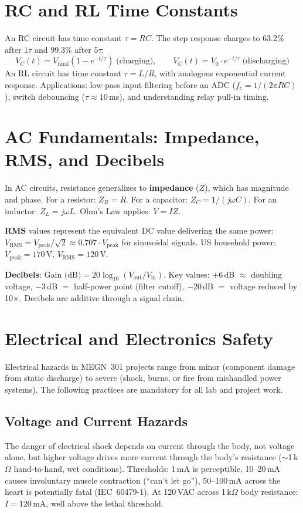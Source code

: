 \section{RC and RL Time Constants}

An RC circuit has time constant $\tau = RC$. The step response charges to 63.2\% after $1\tau$ and 99.3\% after $5\tau$:
\begin{equation}
V_C(t) = V_{\text{final}}\left(1 - e^{-t/\tau}\right) \;\text{(charging)}, \qquad V_C(t) = V_0 \cdot e^{-t/\tau} \;\text{(discharging)}
\end{equation}
An RL circuit has time constant $\tau = L/R$, with analogous exponential current response. Applications: low-pass input filtering before an ADC ($f_c = 1/(2\pi RC)$), switch debouncing ($\tau \approx 10$\,ms), and understanding relay pull-in timing.


\section{AC Fundamentals: Impedance, RMS, and Decibels}

In AC circuits, resistance generalizes to \textbf{impedance} ($Z$), which has magnitude and phase. For a resistor: $Z_R = R$. For a capacitor: $Z_C = 1/(j\omega C)$. For an inductor: $Z_L = j\omega L$. Ohm's Law applies: $V = IZ$.

\textbf{RMS} values represent the equivalent DC value delivering the same power: $V_{\text{RMS}} = V_{\text{peak}}/\sqrt{2} \approx 0.707 \cdot V_{\text{peak}}$ for sinusoidal signals. US household power: $V_{\text{peak}} = 170$\,V, $V_{\text{RMS}} = 120$\,V.

\textbf{Decibels}: $\text{Gain (dB)} = 20\log_{10}(V_{\text{out}}/V_{\text{in}})$. Key values: $+6$\,dB $\approx$ doubling voltage, $-3$\,dB $=$ half-power point (filter cutoff), $-20$\,dB $=$ voltage reduced by 10$\times$. Decibels are additive through a signal chain.


\section{Electrical and Electronics Safety}

Electrical hazards in MEGN~301 projects range from minor (component damage from static discharge) to severe (shock, burns, or fire from mishandled power systems). The following practices are mandatory for all lab and project work.

\subsection{Voltage and Current Hazards}
The danger of electrical shock depends on current through the body, not voltage alone, but higher voltage drives more current through the body's resistance ($\sim$1\,k$\Omega$ hand-to-hand, wet conditions). Thresholds: 1\,mA is perceptible, 10--20\,mA causes involuntary muscle contraction (``can't let go''), 50--100\,mA across the heart is potentially fatal (IEC~60479-1). At 120\,VAC across 1\,k$\Omega$ body resistance: $I = 120$\,mA, well above the lethal threshold.

